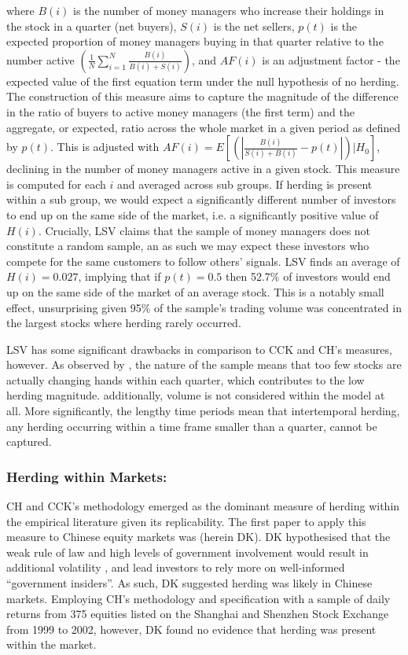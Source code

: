 \documentclass[12pt]{article}
\numberwithin{table}{section}   %
\begin{document}
where $B(i)$ is the number of money managers who increase their holdings in the stock in a quarter (net buyers), $S(i)$ is the net sellers, $p(t)$ is the expected proportion of money managers buying in that quarter relative to the number active $(\frac{1}{N}\sum^N_{i=1}\frac{B(i)}{B(i)+S(i)})$, and $AF(i)$ is an adjustment factor - the expected value of the first equation term under the null hypothesis of no herding. The construction of this measure aims to capture the magnitude of the difference in the ratio of buyers to active money managers (the first term) and the aggregate, or expected, ratio across the whole market in a given period as defined by $p(t)$. This is adjusted with $AF(i)=E[(|\frac{B(i)}{S(i)+B(i)}-p(t)|)|H_0]$, declining in the number of money managers active in a given stock. This measure is computed for each $i$ and averaged across sub groups. If herding is present within a sub group, we would expect a significantly different number of investors to end up on the same side of the market, i.e. a significantly positive value of $H(i)$. Crucially, LSV claims that the sample of money managers does not constitute a random sample, an as such we may expect these investors who compete for the same customers to follow others’ signals. LSV finds an average of $H(i)=0.027$, implying that if $p(t)=0.5$  then 52.7\% of investors would end up on the same side of the market of an average stock. This is a notably small effect, unsurprising given 95\% of the sample’s trading volume was concentrated in the largest stocks where herding rarely occurred. 

LSV has some significant drawbacks in comparison to CCK and CH's measures, however. As observed by \citet{bikh-review}, the nature of the sample means that too few stocks are actually changing hands within each quarter, which contributes to the low herding magnitude. additionally, volume is not considered within the model at all. More significantly, the lengthy time periods mean that intertemporal herding, any herding occurring within a time frame smaller than a quarter, cannot be captured.

\subsubsection*{Herding within Markets:} 

CH and CCK’s methodology emerged as the dominant measure of herding within the empirical literature given its replicability. The first paper to apply this measure to Chinese equity markets was \citet{dk} (herein DK). DK hypothesised that the weak rule of law and high levels of government involvement would result in additional volatility \citep{su}, and lead investors to rely more on well-informed “government insiders”. As such, DK suggested herding was likely in Chinese markets. Employing CH’s methodology and specification with a sample of daily returns from 375 equities listed on the Shanghai and Shenzhen Stock Exchange from 1999 to 2002, however, DK found no evidence that herding was present within the market.
\end{document}
